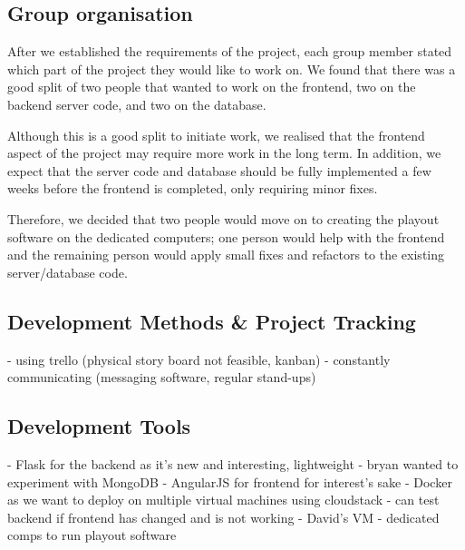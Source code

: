 \documentclass[a4paper]{article}
\begin{document}
\subsection{Group organisation}
After we established the requirements of the project, each group member stated
which part of the project they would like to work on. We found that there was a
good split of two people that wanted to work on the frontend, two on the backend
server code, and two on the database.

Although this is a good split to initiate work, we realised that the frontend 
aspect of the project may require more work in the long term. In addition, we 
expect that the server code and database should be fully implemented a few
weeks before the frontend is completed, only requiring minor fixes.

Therefore, we decided that two people would move on to creating the playout 
software on the dedicated computers; one person would help with the frontend and
the remaining person would apply small fixes and refactors to the existing 
server/database code. 


\subsection{Development Methods \& Project Tracking}
  - using trello (physical story board not feasible, kanban)
  - constantly communicating (messaging software, regular stand-ups)

\subsection{Development Tools}
 	- Flask for the backend as it's new and interesting, lightweight
	- bryan wanted to experiment with MongoDB
	- AngularJS for frontend for interest's sake
	- Docker as we want to deploy on multiple virtual machines using cloudstack
	- can test backend if frontend has changed and is not working
  - David's VM
	- dedicated comps to run playout software
\end{document}
